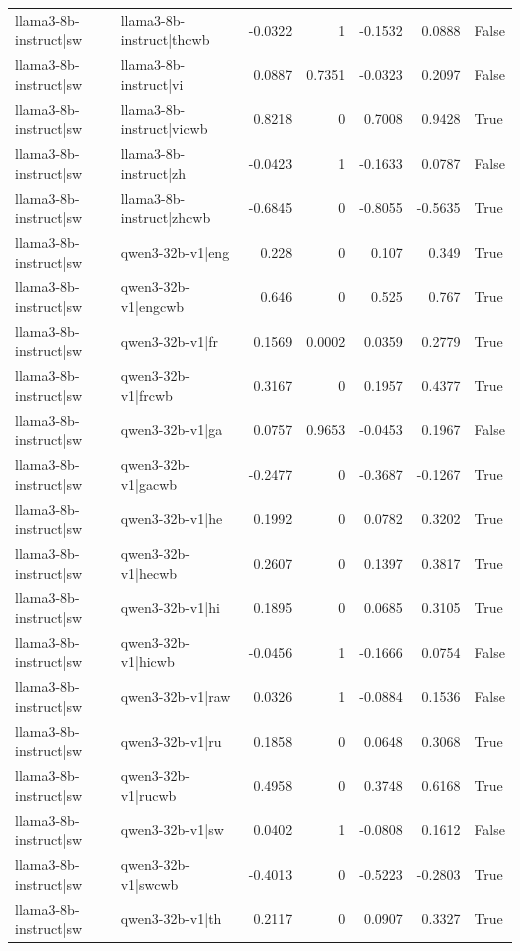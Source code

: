 \begin{table}
\begin{tabular}{l l r r r r l}
llama3-8b-instruct|sw & llama3-8b-instruct|thcwb & -0.0322 & 1 & -0.1532 & 0.0888 & False \\
llama3-8b-instruct|sw & llama3-8b-instruct|vi & 0.0887 & 0.7351 & -0.0323 & 0.2097 & False \\
llama3-8b-instruct|sw & llama3-8b-instruct|vicwb & 0.8218 & 0 & 0.7008 & 0.9428 & True \\
llama3-8b-instruct|sw & llama3-8b-instruct|zh & -0.0423 & 1 & -0.1633 & 0.0787 & False \\
llama3-8b-instruct|sw & llama3-8b-instruct|zhcwb & -0.6845 & 0 & -0.8055 & -0.5635 & True \\
llama3-8b-instruct|sw & qwen3-32b-v1|eng & 0.228 & 0 & 0.107 & 0.349 & True \\
llama3-8b-instruct|sw & qwen3-32b-v1|engcwb & 0.646 & 0 & 0.525 & 0.767 & True \\
llama3-8b-instruct|sw & qwen3-32b-v1|fr & 0.1569 & 0.0002 & 0.0359 & 0.2779 & True \\
llama3-8b-instruct|sw & qwen3-32b-v1|frcwb & 0.3167 & 0 & 0.1957 & 0.4377 & True \\
llama3-8b-instruct|sw & qwen3-32b-v1|ga & 0.0757 & 0.9653 & -0.0453 & 0.1967 & False \\
llama3-8b-instruct|sw & qwen3-32b-v1|gacwb & -0.2477 & 0 & -0.3687 & -0.1267 & True \\
llama3-8b-instruct|sw & qwen3-32b-v1|he & 0.1992 & 0 & 0.0782 & 0.3202 & True \\
llama3-8b-instruct|sw & qwen3-32b-v1|hecwb & 0.2607 & 0 & 0.1397 & 0.3817 & True \\
llama3-8b-instruct|sw & qwen3-32b-v1|hi & 0.1895 & 0 & 0.0685 & 0.3105 & True \\
llama3-8b-instruct|sw & qwen3-32b-v1|hicwb & -0.0456 & 1 & -0.1666 & 0.0754 & False \\
llama3-8b-instruct|sw & qwen3-32b-v1|raw & 0.0326 & 1 & -0.0884 & 0.1536 & False \\
llama3-8b-instruct|sw & qwen3-32b-v1|ru & 0.1858 & 0 & 0.0648 & 0.3068 & True \\
llama3-8b-instruct|sw & qwen3-32b-v1|rucwb & 0.4958 & 0 & 0.3748 & 0.6168 & True \\
llama3-8b-instruct|sw & qwen3-32b-v1|sw & 0.0402 & 1 & -0.0808 & 0.1612 & False \\
llama3-8b-instruct|sw & qwen3-32b-v1|swcwb & -0.4013 & 0 & -0.5223 & -0.2803 & True \\
llama3-8b-instruct|sw & qwen3-32b-v1|th & 0.2117 & 0 & 0.0907 & 0.3327 & True \\

\end{tabular}
\end{table}
